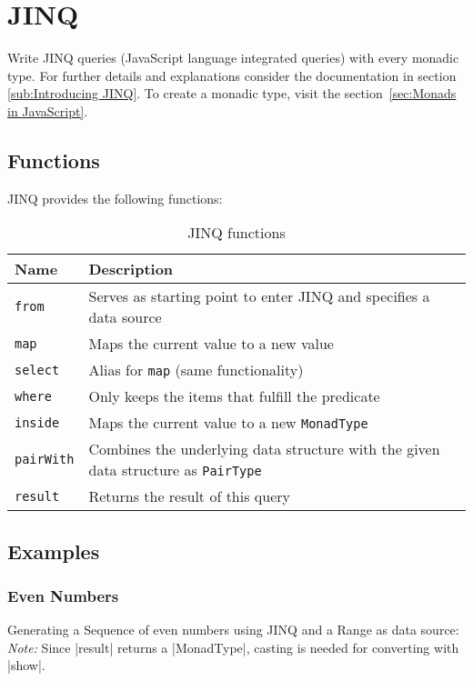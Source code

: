 \section{JINQ} %
\label{sec:API_JINQ}
Write JINQ queries (JavaScript language integrated queries) with every monadic type.
\newline
For further details and explanations consider the documentation in
section \ref{sub:Introducing JINQ}.
\newline
To create a monadic type, visit the section~\ref{sec:Monads in JavaScript}.


\subsection{Functions}
\label{sub:JINQ_Functions}
JINQ provides the following functions:

\begin{table}[H]
  \centering
  \begin{tabularx}{\textwidth}{| l | X |} \hline
    \textbf{Name}       & \textbf{Description} \\ \hline
    \texttt{from}       & Serves as starting point to enter JINQ and specifies a data source \\ \hline 
    \texttt{map}        & Maps the current value to a new value \\ \hline 
    \texttt{select}     & Alias for \texttt{map} (same functionality) \\ \hline 
    \texttt{where}      & Only keeps the items that fulfill the predicate \\ \hline 
    \texttt{inside}     & Maps the current value to a new \texttt{MonadType} \\ \hline 
    \texttt{pairWith}   & Combines the underlying data structure with the given data structure as \texttt{PairType} \\ \hline 
    \texttt{result}     & Returns the result of this query\\ \hline 

  \end{tabularx}
  \caption{JINQ functions}
  \label{tab:jinq_functions}
\end{table}

\subsection{Examples}
\label{sub:JINQ_Examples}

\subsubsection{Even Numbers}
\label{subsub:JINQ_Even Numbers}
Generating a Sequence of even numbers using JINQ and a Range as data source:
\newline
\textit{Note:} Since |result| returns a |MonadType|, casting is needed
for converting with |show|.

